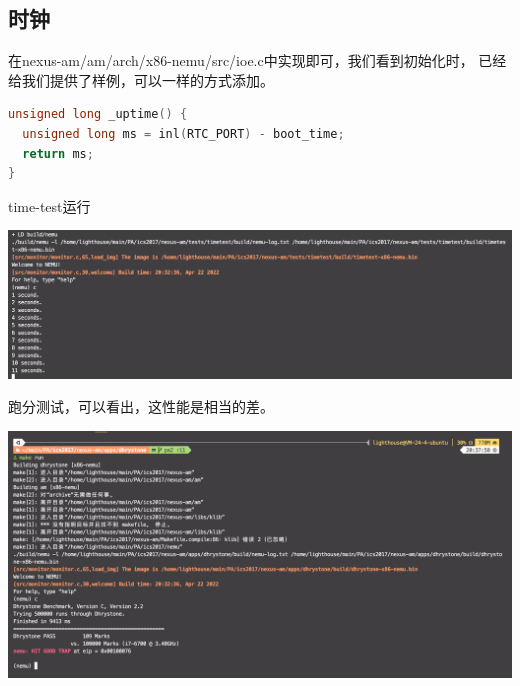 \documentclass[UTF8,a4paper,10pt]{ctexart}
\begin{document}
\subsection{时钟}
在nexus-am/am/arch/x86-nemu/src/ioe.c中实现即可，我们看到初始化时， 已经给我们提供了样例，可以一样的方式添加。
\begin{lstlisting}[language = C]
unsigned long _uptime() {
  unsigned long ms = inl(RTC_PORT) - boot_time;
  return ms;
}
\end{lstlisting}
time-test运行
\begin{center}
  \includegraphics*[scale = 0.3]{time.png}
\end{center}
跑分测试，可以看出，这性能是相当的差。
  \begin{center}
    \includegraphics*[scale = 0.3]{paofen1.png}
  \end{center}
  
\end{document}

